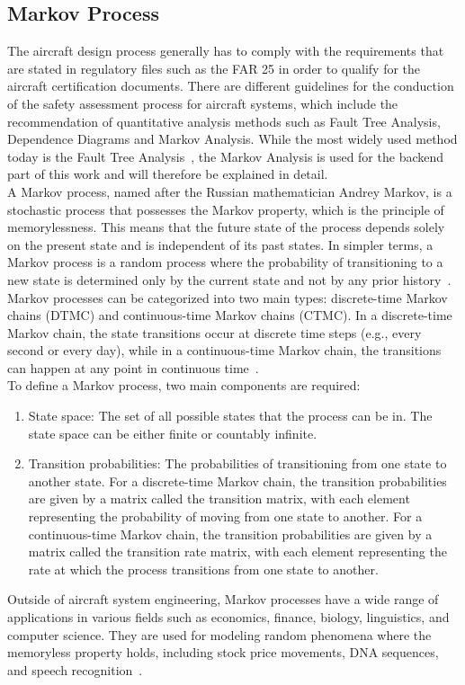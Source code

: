 \subsection{Markov Process}\label{subsec:markov-process}
The aircraft design process generally has to comply with the requirements that are stated in regulatory files such as the FAR 25
in order to qualify for the aircraft certification documents.
There are different guidelines for the conduction of the safety assessment process for aircraft systems, which include the
recommendation of quantitative analysis methods such as Fault Tree Analysis, Dependence Diagrams and Markov Analysis.
While the most widely used method today is the Fault Tree Analysis~\cite{7447967}, the Markov Analysis is used for the backend
part of this work and will therefore be explained in detail.
\\
A Markov process, named after the Russian mathematician Andrey Markov, is a stochastic process that possesses the Markov property,
which is the principle of memorylessness.
This means that the future state of the process depends solely on the present state and is independent of its past states.
In simpler terms, a Markov process is a random process where the probability of transitioning to a new state is determined
only by the current state and not by any prior history~\cite{markov-processes}.
\\
Markov processes can be categorized into two main types:
discrete-time Markov chains (DTMC) and continuous-time Markov chains (CTMC).
In a discrete-time Markov chain, the state transitions occur at discrete time steps (e.g., every second or every day),
while in a continuous-time Markov chain, the transitions can happen at any point in continuous time~\cite{markov-processes, VANKAMPEN200773}.
\\
To define a Markov process, two main components are required:
\begin{enumerate}
    \item State space: The set of all possible states that the process can be in. The state space can be either finite or countably infinite.
    \item Transition probabilities: The probabilities of transitioning from one state to another state. For a discrete-time Markov chain, the transition probabilities are given by a matrix called the transition matrix, with each element representing the probability of moving from one state to another. For a continuous-time Markov chain, the transition probabilities are given by a matrix called the transition rate matrix, with each element representing the rate at which the process transitions from one state to another.
\end{enumerate}
Outside of aircraft system engineering, Markov processes have a wide range of applications in various fields such as economics, finance, biology, linguistics,
and computer science.
They are used for modeling random phenomena where the memoryless property holds,
including stock price movements, DNA sequences, and speech recognition~\cite{markov-usage}.

